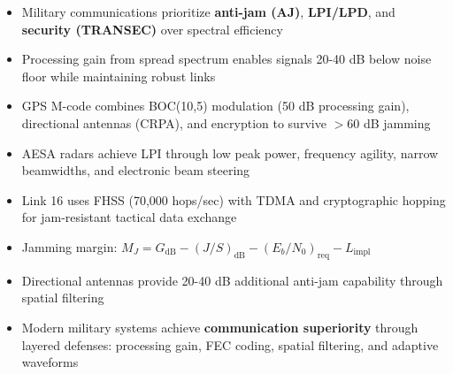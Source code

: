 \begin{itemize}
\item Military communications prioritize \textbf{anti-jam (AJ)}, \textbf{LPI/LPD}, and \textbf{security (TRANSEC)} over spectral efficiency
\item Processing gain from spread spectrum enables signals 20-40 dB below noise floor while maintaining robust links
\item GPS M-code combines BOC(10,5) modulation (50 dB processing gain), directional antennas (CRPA), and encryption to survive $>60$ dB jamming
\item AESA radars achieve LPI through low peak power, frequency agility, narrow beamwidths, and electronic beam steering
\item Link 16 uses FHSS (70,000 hops/sec) with TDMA and cryptographic hopping for jam-resistant tactical data exchange
\item Jamming margin: $M_J = G_{\text{dB}} - (J/S)_{\text{dB}} - (E_b/N_0)_{\text{req}} - L_{\text{impl}}$
\item Directional antennas provide 20-40 dB additional anti-jam capability through spatial filtering
\item Modern military systems achieve \textbf{communication superiority} through layered defenses: processing gain, FEC coding, spatial filtering, and adaptive waveforms
\end{itemize}
